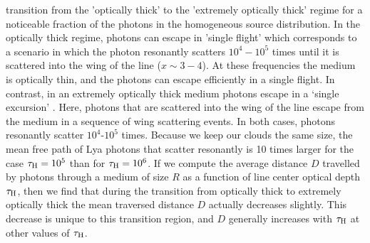 transition from the 'optically thick' to the 'extremely optically
thick' regime for a noticeable fraction of the photons in the
homogeneous source distribution.
In the optically thick regime, \ly photons can escape in
'single flight' which corresponds to a scenario in which the
photon resonantly scatters $10^4-10^5$ times until it is scattered
into the wing of the line ($x\sim 3-4$).
At these frequencies the medium is optically thin, and the photons can
escape efficiently in a single flight.
In contrast, in an extremely optically thick medium \ly
photons escape in a `single excursion' \citep{Adams72}.
Here, photons that are scattered into the wing of the line escape from
the medium in a sequence of wing scattering events.
In both cases, \ly photons resonantly scatter $10^4$-$10^5$ times.
Because we keep our clouds the same size, the mean free path of Lya
photons that scatter resonantly is 10 times larger for the case
$\tau_{\rm H}=10^5$ than for $\tau_{\rm H}=10^6$.
If we compute the average distance $D$ travelled by \ly
photons through a medium of size $R$ as a function of line center
optical depth $\tau_{\rm H}$, then we find that during the transition
from optically thick to extremely optically thick the mean traversed
distance $D$ actually decreases slightly.
This decrease is unique to this transition region, and $D$ generally
increases with $\tau_{\rm H}$ at other values of $\tau_{\rm H}$.
